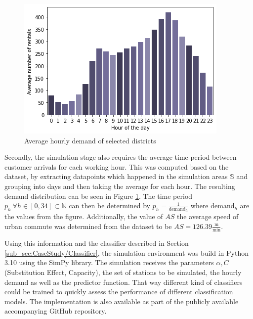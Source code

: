 \begin{figure}[htbp]
  \centering
  \includegraphics[width=.5\linewidth]{./Figures/hourly-demand.png}
  \caption{Average hourly demand of selected districts}
  \label{fig:Demand}
\end{figure}

Secondly, the simulation stage also requires the average time-period between customer arrivals for each working hour.
This was computed based on the dataset, by extracting datapoints which happened in the simulation areas $\mathbb{S}$ 
and grouping into days and then taking the average for each hour. The resulting
demand distribution can be seen in Figure \ref{fig:Demand}. The time period $p_h \ \forall h \in [0, 34] \subset \mathbb{N}$
can then be determined by $p_h = \frac{1}{\text{demand}_h}$ where $\text{demand}_h$ are the values from the figure.
Additionally, the value of $AS$ the average speed of urban commute was determined from the dataset to be $AS = 126.39 \frac{\text{m}}{\text{min}}$.

Using this information and the classifier described in Section \ref{sub_sec:CaseStudy/Classifier}, the simulation environment
was build in Python 3.10 using the SimPy library. The simulation receives the parameters $\alpha, C$ (Substitution Effect, Capacity),
the set of stations to be simulated, the hourly demand as well as the predictor function. That way different kind of classifiers
could be trained to quickly assess the performance of different classification models. The implementation
is also available as part of the publicly available accompanying GitHub repository.